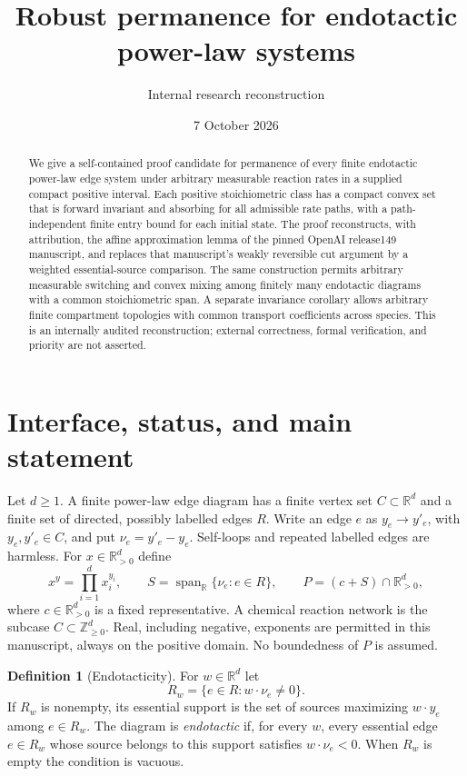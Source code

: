 \documentclass[11pt]{article}
\title{Robust permanence for endotactic power-law systems}
\author{Internal research reconstruction}
\date{7 October 2026}
\theoremstyle{definition}
\newtheorem{definition}[theorem]{Definition}
\theoremstyle{remark}
\newcommand{\R}{\mathbb R}
\DeclareMathOperator{\spanR}{span}
\numberwithin{equation}{section}
\begin{document}
\maketitle
\begin{abstract}
We give a self-contained proof candidate for permanence of every finite
endotactic power-law edge system under arbitrary measurable reaction
rates in a supplied compact positive interval. Each positive
stoichiometric class has a compact convex set that is forward invariant
and absorbing for all admissible rate paths, with a path-independent
finite entry bound for each initial state. The proof reconstructs,
with attribution, the affine approximation lemma of the pinned OpenAI
release149 manuscript, and replaces that manuscript's weakly reversible
cut argument by a weighted essential-source comparison. The same
construction permits arbitrary measurable switching and convex mixing
among finitely many endotactic diagrams with a common stoichiometric
span. A separate invariance corollary allows arbitrary finite
compartment topologies with common transport coefficients across
species. This is an internally audited reconstruction; external
correctness, formal verification, and priority are not asserted.
\end{abstract}

\section{Interface, status, and main statement}
\label{sec:interface}

Let $d\geq1$. A finite power-law edge diagram has a finite vertex set
$C\subset\R^d$ and a finite set of directed, possibly labelled edges
$R$. Write an edge $e$ as $y_e\to y'_e$, with $y_e,y'_e\in C$, and put
$\nu_e=y'_e-y_e$. Self-loops and repeated labelled edges are harmless.
For $x\in\R_{>0}^d$ define
\[
 x^y=\prod_{i=1}^d x_i^{y_i},\qquad
 S=\spanR_{\R}\{\nu_e:e\in R\},\qquad
 P=(c+S)\cap\R_{>0}^d,
\]
where $c\in\R_{>0}^d$ is a fixed representative. A chemical reaction
network is the subcase $C\subset\mathbb Z_{\geq0}^d$. Real, including
negative, exponents are permitted in this manuscript, always on the
positive domain. No boundedness of $P$ is assumed.

\begin{definition}[Endotacticity]
\label{def:endotactic}
For $w\in\R^d$ let
\[
 R_w=\{e\in R:w\cdot\nu_e\ne0\}.
\]
If $R_w$ is nonempty, its essential support is the set of sources
maximizing $w\cdot y_e$ among $e\in R_w$. The diagram is
\emph{endotactic} if, for every $w$, every essential edge $e\in R_w$
whose source belongs to this support satisfies $w\cdot\nu_e<0$.
When $R_w$ is empty the
condition is vacuous.
\end{definition}
\end{document}
